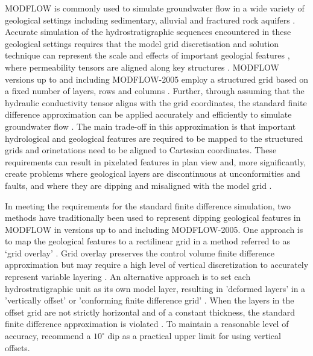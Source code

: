 \documentclass{article}
\begin{document}
MODFLOW is commonly used to simulate groundwater flow in a wide variety of geological settings including sedimentary, alluvial and fractured rock aquifers \cite{modflow2005,Kumar2019}. Accurate simulation of the hydrostratigraphic sequences encountered in these geological settings requires that the model grid discretisation and solution technique can represent the scale and effects of important geologial features \cite{Reilly2004,bardot2022}, where permeability tensors are aligned along key structures \cite{hoaglund2003}. MODFLOW versions up to and including MODFLOW-2005 employ a structured grid based on a fixed number of layers, rows and columns \citep{modflow2005,modflow84,modflow88}. Further, through assuming that the hydraulic conductivity tensor aligns with the grid coordinates, the standard finite difference approximation can be applied accurately and efficiently to simulate groundwater flow \citep{modflow84}. The main trade-off in this approximation is that important hydrological and geological features are required to be mapped to the structured grids and orinetations need to be aligned to Cartesian coordinates. These requirements can result in pixelated features in plan view and, more significantly, create problems where geological layers are discontinuous at unconformities and faults, and where they are dipping and misaligned with the model grid \citep{bardot2022}. 

In meeting the requirements for the standard finite difference simulation, two methods have traditionally been used to represent dipping geological features in MODFLOW in versions up to and including MODFLOW-2005. One approach is to map the geological features to a rectilinear grid \citep{modflow84} in a method referred to as ‘grid overlay’  \citep{hoaglund2003}. Grid overlay preserves the control volume finite difference approximation but may require a high level of vertical discretization to accurately represent variable layering \citep{Zyvoloski2006}. An alternative approach is to set each hydrostratigraphic unit as its own model layer, resulting in 'deformed layers' \cite{anderson2015applied,Reilly2004} in a 'vertically offset' or 'conforming finite difference grid' \citep{Zyvoloski2006}. When the layers in the offset grid are not strictly horizontal and of a constant thickness, the standard finite difference approximation is violated \citep{Zheng1994,anderson2015applied,Reilly2004}. To maintain a reasonable level of accuracy, \cite{anderson2015applied} recommend a $10^{\circ}$ dip as a practical upper limit for using vertical offsets.
\end{document}
